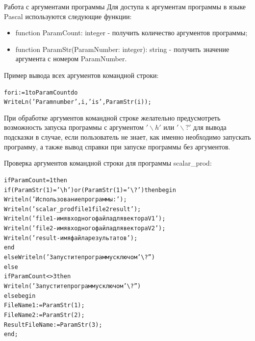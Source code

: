 \documentclass{beamer}
\begin{document}
\begin{frame}[fragile]{Работа с аргументами программы}
Для доступа к аргументам программы в языке Pascal используются следующие функции:
\begin{itemize}
\item function ParamCount: integer - получить количество аргументов программы;
\item function ParamStr(ParamNumber: integer): string - получить значение аргумента с номером ParamNumber.
\end{itemize}
Пример вывода всех аргументов командной строки:
\begin{alltt}
for i := 1 to ParamCount do
  WriteLn('Param number ', i, ' is ', ParamStr(i));
\end{alltt}
При обработке аргументов командной строке желательно предусмотреть возможность запуска программы с аргументом $'\backslash h'$ или $'\backslash ?'$ для вывода подсказки в случае, если пользователь не знает, как именно необходимо запускать программу, а также вывод справки при запуске программы без аргументов.
\end{frame}

\begin{frame}[fragile]
Проверка аргументов командной строки для программы scalar\_prod: \begin{alltt}
  if ParamCount = 1 then
    if (ParamStr(1)= '\textbackslash\hspace{0pt}h') or (ParamStr(1)= '\textbackslash?') then begin
      Writeln('Использование программы:');
      Writeln('   scalar\_prod file1 file2 result');
      Writeln('   file1 - имя входного файла для вектора V1');
      Writeln('   file2 - имя входного файла для вектора V2');      
      Writeln('   result - имя файла результатов');   
    end
    else Writeln('Запустите программу с ключом '\textbackslash?'')
  else
    if ParamCount <> 3 then
      Writeln('Запустите программу с ключом '\textbackslash?'')
    else begin
      FileName1 := ParamStr(1);
      FileName2 := ParamStr(2);
      ResultFileName := ParamStr(3);      
    end;
\end{alltt}
\end{frame}
\end{document}
